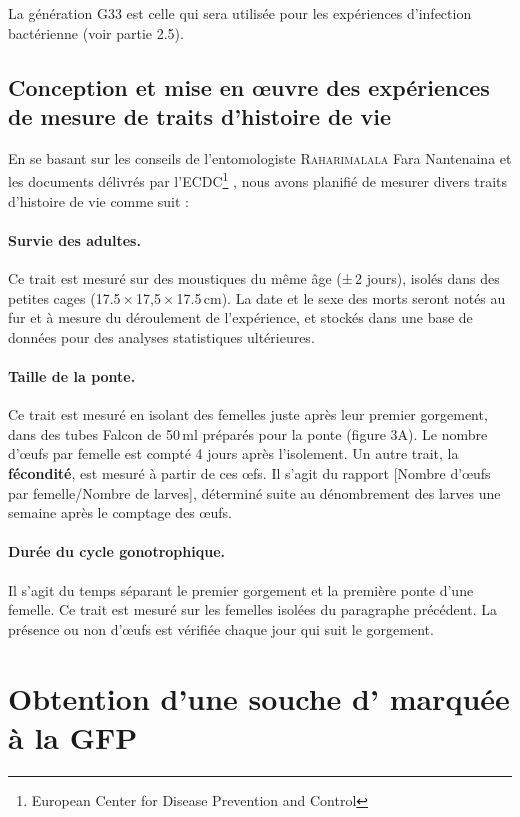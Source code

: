 La génération G33 est celle qui sera utilisée pour les expériences d'infection bactérienne (voir partie 2.5).

\subsection{Conception et mise en \oe{}uvre des expériences de mesure de traits d'histoire de vie}

En se basant sur les conseils de l'entomologiste \textsc{Raharimalala} Fara Nantenaina et les documents délivrés par l'ECDC\footnote{European Center for Disease Prevention and Control} \cite{ecdc}, nous avons planifié de mesurer divers traits d'histoire de vie comme suit :

\paragraph{Survie des adultes.} Ce trait est mesuré sur des moustiques du même âge (±\,2 jours), isolés dans des petites cages (17.5\,×\,17,5\,×\,17.5\,cm). La date et le sexe des morts seront notés au fur et à mesure du déroulement de l'expérience, et stockés dans une base de données pour des analyses statistiques ultérieures.

\paragraph{Taille de la ponte.} Ce trait est mesuré en isolant des femelles juste après leur premier gorgement, dans des tubes Falcon de 50\,ml préparés pour la ponte (figure 3A). Le nombre d'\oe{}ufs par femelle est compté 4 jours après l'isolement.
Un autre trait, la \textbf{fécondité}, est mesuré à partir de ces \oe{}fs. Il s'agit du rapport [Nombre d'\oe{}ufs par femelle/Nombre de larves], déterminé suite au dénombrement des larves une semaine après le comptage des \oe{}ufs.

\paragraph{Durée du cycle gonotrophique.} Il s'agit du temps séparant le premier gorgement et la première ponte d'une femelle. Ce trait est mesuré sur les femelles isolées du paragraphe précédent. La présence ou non d'\oe{}ufs est vérifiée chaque jour qui suit le gorgement.

\section{Obtention d'une souche d' marquée à la GFP}

